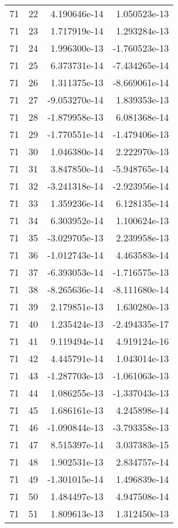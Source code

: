 \begin{tabular}{rrrr}
  71 &   22 &  4.190646e-14 &  1.050523e-13 \\
  71 &   23 &  1.717919e-14 &  1.293284e-13 \\
  71 &   24 &  1.996300e-13 & -1.760523e-13 \\
  71 &   25 &  6.373731e-14 & -7.434265e-14 \\
  71 &   26 &  1.311375e-13 & -8.669061e-14 \\
  71 &   27 & -9.053270e-14 &  1.839353e-13 \\
  71 &   28 & -1.879958e-13 &  6.081368e-14 \\
  71 &   29 & -1.770551e-14 & -1.479406e-13 \\
  71 &   30 &  1.046380e-14 &  2.222970e-13 \\
  71 &   31 &  3.847850e-14 & -5.948765e-14 \\
  71 &   32 & -3.241318e-14 & -2.923956e-14 \\
  71 &   33 &  1.359236e-14 &  6.128135e-14 \\
  71 &   34 &  6.303952e-14 &  1.100624e-13 \\
  71 &   35 & -3.029705e-13 &  2.239958e-13 \\
  71 &   36 & -1.012743e-14 &  4.463583e-14 \\
  71 &   37 & -6.393053e-14 & -1.716575e-13 \\
  71 &   38 & -8.265636e-14 & -8.111680e-14 \\
  71 &   39 &  2.179851e-13 &  1.630280e-13 \\
  71 &   40 &  1.235424e-13 & -2.494335e-17 \\
  71 &   41 &  9.119494e-14 &  4.919124e-16 \\
  71 &   42 &  4.445791e-14 &  1.043014e-13 \\
  71 &   43 & -1.287703e-13 & -1.061063e-13 \\
  71 &   44 &  1.086255e-13 & -1.337043e-13 \\
  71 &   45 &  1.686161e-13 &  4.245898e-14 \\
  71 &   46 & -1.090844e-13 & -3.793358e-13 \\
  71 &   47 &  8.515397e-14 &  3.037383e-15 \\
  71 &   48 &  1.902531e-13 &  2.834757e-14 \\
  71 &   49 & -1.301015e-14 &  1.496839e-14 \\
  71 &   50 &  1.484497e-13 &  4.947508e-14 \\
  71 &   51 &  1.809613e-13 &  1.312450e-13 \\

\end{tabular}
